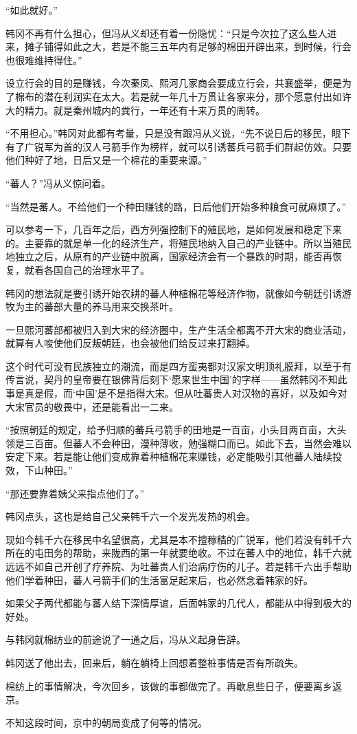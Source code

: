 “如此就好。”

韩冈不再有什么担心，但冯从义却还有着一份隐忧：“只是今次拉了这么些人进来，摊子铺得如此之大，若是不能三五年内有足够的棉田开辟出来，到时候，行会也很难维持得住。”

设立行会的目的是赚钱，今次秦凤、熙河几家商会要成立行会，共襄盛举，便是为了棉布的潜在利润实在太大。若是就一年几十万贯让各家来分，那个愿意付出如许大的精力。就是秦州城内的粪行，一年还有十来万贯的周转。

“不用担心。”韩冈对此都有考量，只是没有跟冯从义说，“先不说日后的移民，眼下有了广锐军为首的汉人弓箭手作为榜样，就可以引诱蕃兵弓箭手们群起仿效。只要他们种好了地，日后又是一个棉花的重要来源。”

“蕃人？”冯从义惊问着。

“当然是蕃人。不给他们一个种田赚钱的路，日后他们开始多种粮食可就麻烦了。”

可以参考一下，几百年之后，西方列强控制下的殖民地，是如何发展和稳定下来的。主要靠的就是单一化的经济生产，将殖民地纳入自己的产业链中。所以当殖民地独立之后，从原有的产业链中脱离，国家经济会有一个暴跌的时期，能否再恢复，就看各国自己的治理水平了。

韩冈的想法就是要引诱开始农耕的蕃人种植棉花等经济作物，就像如今朝廷引诱游牧为主的蕃部大量的养马用来交换茶叶。

一旦熙河蕃部都被归入到大宋的经济圈中，生产生活全都离不开大宋的商业活动，就算有人唆使他们反叛朝廷，也会被他们给反过来打翻掉。

这个时代可没有民族独立的潮流，而是四方蛮夷都对汉家文明顶礼膜拜，以至于有传言说，契丹的皇帝要在银佛背后刻下‘愿来世生中国’的字样——虽然韩冈不知此事是真是假，而‘中国’是不是指得大宋。但从吐蕃贵人对汉物的喜好，以及如今对大宋官员的敬畏中，还是能看出一二来。

“按照朝廷的规定，给予归顺的蕃兵弓箭手的田地是一百亩，小头目两百亩，大头领是三百亩。但蕃人不会种田，漫种薄收，勉强糊口而已。如此下去，当然会难以安定下来。若是能让他们变成靠着种植棉花来赚钱，必定能吸引其他蕃人陆续投效，下山种田。”

“那还要靠着姨父来指点他们了。”

韩冈点头，这也是给自己父亲韩千六一个发光发热的机会。

现如今韩千六在移民中名望很高，尤其是本不擅稼穑的广锐军，他们若没有韩千六所在的屯田务的帮助，来陇西的第一年就要绝收。不过在蕃人中的地位，韩千六就远远不如自己开创了疗养院、为吐蕃贵人们治病疗伤的儿子。若是韩千六出手帮助他们学着种田，蕃人弓箭手们的生活富足起来后，也必然念着韩家的好。

如果父子两代都能与蕃人结下深情厚谊，后面韩家的几代人，都能从中得到极大的好处。

与韩冈就棉纺业的前途说了一通之后，冯从义起身告辞。

韩冈送了他出去，回来后，躺在躺椅上回想着整桩事情是否有所疏失。

棉纺上的事情解决，今次回乡，该做的事都做完了。再歇息些日子，便要离乡返京。

不知这段时间，京中的朝局变成了何等的情况。

